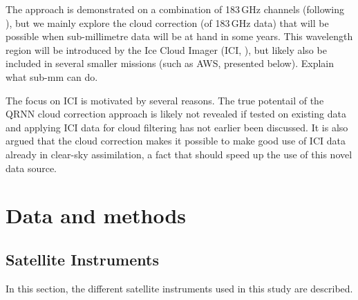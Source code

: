 \documentclass[amt, manuscript]{copernicus}
\newcommand{\todo}[1]{{\color{red} #1}}
\begin{document}
The approach is demonstrated on a combination of 183\,GHz channels (following
\citet{buehler:aclou:07}), but we mainly explore the cloud correction (of
183\,GHz data) that will be possible when sub-millimetre data will be at hand
in some years. This wavelength region will be introduced by the Ice Cloud
Imager (ICI, \citet{eriksson:towar:20}), but likely also be included in several
smaller missions (such as AWS, presented below). \todo{Explain what sub-mm can
  do}.

The focus on ICI is motivated by several reasons. The true potentail of the
QRNN cloud correction approach is likely not revealed if tested on existing
data and applying ICI data for cloud filtering has not earlier been discussed.
It is also argued that the cloud correction makes it possible to make good use
of ICI data already in clear-sky assimilation, a fact that should speed up the
use of this novel data source.



\section{Data and methods}
%
\subsection{Satellite Instruments}
In this section, the different satellite instruments used in this study are described.
\end{document}
